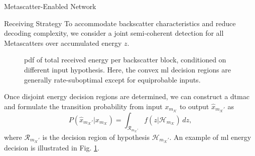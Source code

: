 \documentclass[journal]{IEEEtran}
\begin{document}
\begin{section}{Metascatter-Enabled Network}
\begin{subsection}{Receiving Strategy}
		To accommodate backscatter characteristics and reduce decoding complexity, we consider a joint semi-coherent detection for all Metascatters over accumulated energy $z$.
		\begin{figure}[!t]
			\centering
			\resizebox{0.9\columnwidth}{!}{
				
			}
			\caption{
				\gls{pdf} of total received energy per backscatter block, conditioned on different input hypothesis.
				Here, the convex \gls{ml} decision regions are generally rate-suboptimal except for equiprobable inputs.
			}
			\label{fi:energy_distribution}
		\end{figure}
		Once disjoint energy decision regions are determined, we can construct a \gls{dtmac} and formulate the transition probability from input $x_{m_{\mathcal{K}}}$ to output $\hat{x}_{m_{\mathcal{K}}'}$ as
		\begin{equation}
			P(\hat{x}_{m_{\mathcal{K}}'}|x_{m_{\mathcal{K}}}) = \int_{\mathcal{R}_{m_{\mathcal{K}}'}} f(z|\mathcal{H}_{m_{\mathcal{K}}}) \, d z,
			\label{eq:dtmac}
		\end{equation}
		where $\mathcal{R}_{m_{\mathcal{K}}'}$ is the decision region of hypothesis $\mathcal{H}_{m_{\mathcal{K}}'}$. An example of \gls{ml} energy decision is illustrated in Fig. \ref{fi:energy_distribution}.


\end{subsection}
\end{section}
\end{document}
